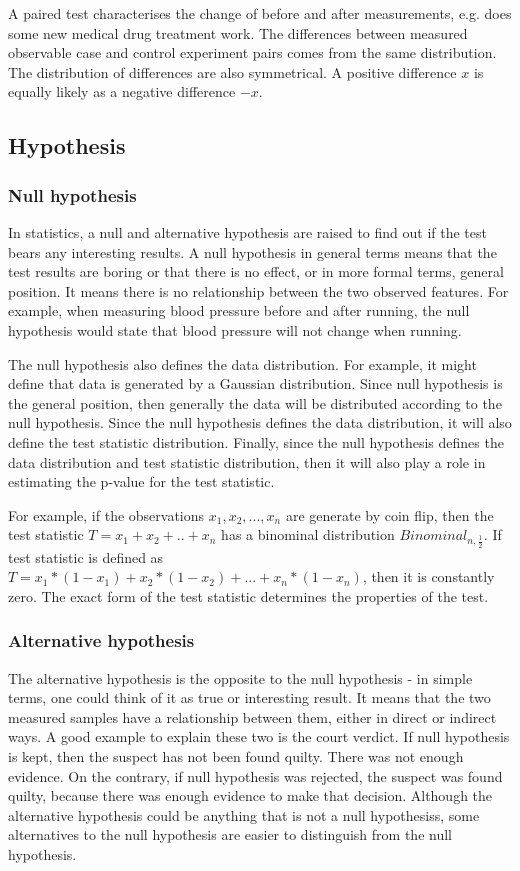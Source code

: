 \documentclass[12pt]{article}
\begin{document}
A paired test characterises the change of before and after measurements, e.g. does some new medical drug treatment work. The differences between measured observable case and control experiment pairs comes from the same distribution. The distribution of differences are also symmetrical. A positive difference $x$ is equally likely as a negative difference $-x$.

\subsection{Hypothesis}

\subsubsection{Null hypothesis}

In statistics, a null and alternative hypothesis are raised to find out if the test bears any interesting results. A null hypothesis in general terms means that the test results are boring or that there is no effect, or in more formal terms, general position. It means there is no relationship between the two observed features. For example, when measuring blood pressure before and after running, the null hypothesis would state that blood pressure will not change when running.

The null hypothesis also defines the data distribution. For example, it might define that data is generated by a Gaussian distribution. Since null hypothesis is the general position, then generally the data will be distributed according to the null hypothesis. Since the null hypothesis defines the data distribution, it will also define the test statistic distribution. Finally, since the null hypothesis defines the data distribution and test statistic distribution, then it will also play a role in estimating the p-value for the test statistic.

For example, if the observations $x_1, x_2, ..., x_n$ are generate by coin flip, then the test statistic $T=x_1 + x_2 + .. + x_n$ has a binominal distribution $Binominal_{n,\frac{1}{2}}$. If test statistic is defined as $T=x_1 * (1-x_1) + x_2 * (1-x_2) + ... + x_n * (1-x_n)$, then it is constantly zero. The exact form of the test statistic determines the properties of the test.

\subsubsection{Alternative hypothesis}
The alternative hypothesis is the opposite to the null hypothesis - in simple terms, one could think of it as true or interesting result. It means that the two measured samples have a relationship between them, either in direct or indirect ways. A good example to explain these two is the court verdict. If null hypothesis is kept, then the suspect has not been found quilty. There was not enough evidence. On the contrary, if null hypothesis was rejected, the suspect was found quilty, because there was enough evidence to make that decision. Although the alternative hypothesis could be anything that is not a null hypothesiss, some alternatives to the null hypothesis are easier to distinguish from the null hypothesis.
\end{document}
